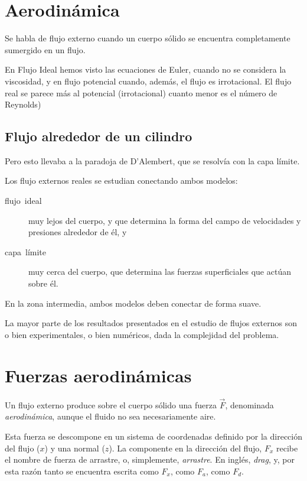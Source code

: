 \section{Aerodinámica}

	
	Se habla de flujo externo cuando un cuerpo sólido se encuentra completamente
	sumergido en un flujo.
	
	En Flujo Ideal hemos visto las ecuaciones de Euler, cuando no se considera
	la viscosidad, y en flujo potencial cuando, además, el flujo es irrotacional.
	El flujo real se parece más al potencial (irrotacional) cuanto menor
	es el número de Reynolds)
\subsection{Flujo alrededor de un cilindro}
	
	\begin{center}
	\end{center}
	

	
	Pero esto llevaba a la paradoja de D'Alembert, que se resolvía con
	la capa límite.
	
	Los flujo externos reales se estudian conectando ambos modelos: 
	\begin{description}
		\item [{flujo~ideal}] muy lejos del cuerpo, y que determina la forma del
		campo de velocidades y presiones alrededor de él, y 
		\item [{capa~límite}] muy cerca del cuerpo, que determina las fuerzas
		superficiales que actúan sobre él. 
	\end{description}
	En la zona intermedia, ambos modelos deben conectar de forma suave.
	
	La mayor parte de los resultados presentados en el estudio de flujos
	externos son o bien experimentales, o bien numéricos, dada la complejidad
	del problema.


\section{Fuerzas aerodinámicas}

	
	Un flujo externo produce sobre el cuerpo sólido una fuerza $\vec{F}$,
	denominada \textit{aerodinámica}, aunque el fluido no sea necesariamente
	aire.
	
	Esta fuerza se descompone en un sistema de coordenadas definido por
	la dirección del flujo ($x$) y una normal ($z$). La componente en
	la dirección del flujo, $F_{x}$ recibe el nombre de fuerza de arrastre,
	o, simplemente, \textit{arrastre}. En inglés, \textit{drag}, y, por
	esta razón tanto se encuentra escrita como $F_{x}$, como $F_{a}$,
	como $F_{d}$.
	
